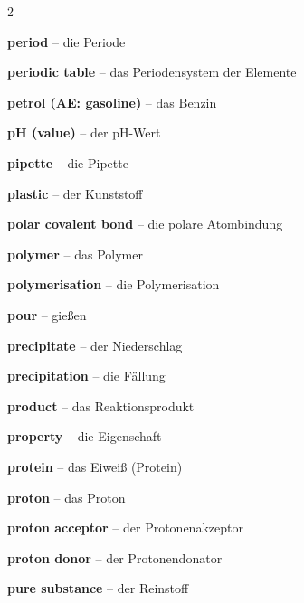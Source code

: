 \begin{multicols}{2}
\par\nopagebreak
\textbf{period} -- die Periode\dotfill\hyperref[e:86]{\pageref*{e:86}}\par
\textbf{periodic table} -- das Periodensystem der Elemente\dotfill\hyperref[e:85]{\pageref*{e:85}}\par
\textbf{petrol (AE: gasoline)} -- das Benzin\dotfill\hyperref[e:235]{\pageref*{e:235}}\par
\textbf{pH (value)} -- der pH-Wert\dotfill\hyperref[e:158]{\pageref*{e:158}}\par
\textbf{pipette} -- die Pipette\dotfill\hyperref[e:50]{\pageref*{e:50}}\par
\textbf{plastic} -- der Kunststoff\dotfill\hyperref[e:239]{\pageref*{e:239}}\par
\textbf{polar covalent bond} -- die polare Atombindung\dotfill\hyperref[e:116]{\pageref*{e:116}}\par
\textbf{polymer} -- das Polymer\dotfill\hyperref[e:237]{\pageref*{e:237}}\par
\textbf{polymerisation} -- die Polymerisation\dotfill\hyperref[e:238]{\pageref*{e:238}}\par
\textbf{pour} -- gießen\dotfill\hyperref[e:68]{\pageref*{e:68}}\par
\textbf{precipitate} -- der Niederschlag\dotfill\hyperref[e:137]{\pageref*{e:137}}\par
\textbf{precipitation} -- die Fällung\dotfill\hyperref[e:136]{\pageref*{e:136}}\par
\textbf{product} -- das Reaktionsprodukt\dotfill\hyperref[e:127]{\pageref*{e:127}}\par
\textbf{property} -- die Eigenschaft\dotfill\hyperref[e:20]{\pageref*{e:20}}\par
\textbf{protein} -- das Eiweiß (Protein)\dotfill\hyperref[e:244]{\pageref*{e:244}}\par
\textbf{proton} -- das Proton\dotfill\hyperref[e:74]{\pageref*{e:74}}\par
\textbf{proton acceptor} -- der Protonenakzeptor\dotfill\hyperref[e:163]{\pageref*{e:163}}\par
\textbf{proton donor} -- der Protonendonator\dotfill\hyperref[e:162]{\pageref*{e:162}}\par
\textbf{pure substance} -- der Reinstoff\dotfill\hyperref[e:2]{\pageref*{e:2}}\par


\end{multicols}
